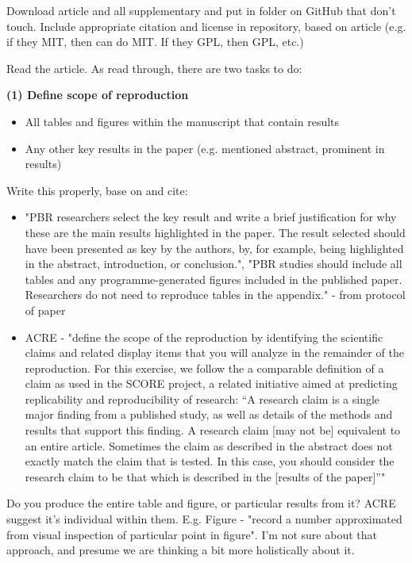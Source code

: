 Download article and all supplementary and put in folder on GitHub that don't touch. Include appropriate citation and license in repository, based on article (e.g. if they MIT, then can do MIT. If they GPL, then GPL, etc.)

Read the article. As read through, there are two tasks to do:

\textbf{(1) Define scope of reproduction}
\begin{itemize}
    \item All tables and figures within the manuscript that contain results
    \item Any other key results in the paper (e.g. mentioned abstract, prominent in results)
\end{itemize}

Write this properly, base on and cite:
\begin{itemize}
    \item "PBR researchers select the key result and write a brief justification for why these are the main results highlighted in the paper. The result selected should have been presented as key by the authors, by, for example, being highlighted in the abstract, introduction, or conclusion.", "PBR studies should include all tables and any programme-generated figures included in the published paper. Researchers do not need to reproduce tables in the appendix." - from protocol\autocite{wood_replication_2018} of paper\autocite{wood_push_2018}
    \item ACRE - "define the scope of the reproduction by identifying the scientific claims and related display items that you will analyze in the remainder of the reproduction. For this exercise, we follow the a comparable definition of a claim as used in the SCORE project, a related initiative aimed at predicting replicability and reproducibility of research: “A research claim is a single major finding from a published study, as well as details of the methods and results that support this finding. A research claim [may not be] equivalent to an entire article. Sometimes the claim as described in the abstract does not exactly match the claim that is tested. In this case, you should consider the research claim to be that which is described in the [results of the paper]”" \cite{berkeley_initiative_for_transparency_in_the_social_sciences_guide_2022}
\end{itemize}

Do you produce the entire table and figure, or particular results from it? ACRE suggest it's individual within them. E.g. Figure - "record a number approximated from visual inspection of particular point in figure". I'm not sure about that approach, and presume we are thinking a bit more holistically about it.


